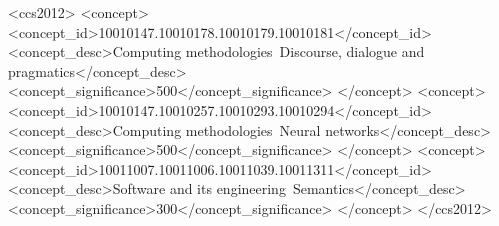 \documentclass[format=acmsmall, review=false, screen=true]{acmart}
\begin{document}
%
%
\begin{CCSXML}
<ccs2012>
<concept>
<concept_id>10010147.10010178.10010179.10010181</concept_id>
<concept_desc>Computing methodologies~Discourse, dialogue and pragmatics</concept_desc>
<concept_significance>500</concept_significance>
</concept>
<concept>
<concept_id>10010147.10010257.10010293.10010294</concept_id>
<concept_desc>Computing methodologies~Neural networks</concept_desc>
<concept_significance>500</concept_significance>
</concept>
<concept>
<concept_id>10011007.10011006.10011039.10011311</concept_id>
<concept_desc>Software and its engineering~Semantics</concept_desc>
<concept_significance>300</concept_significance>
</concept>
</ccs2012>
\end{CCSXML}


%
%






\maketitle

\renewcommand{\shortauthors}{Z. Zhang et al.}


\end{document}
